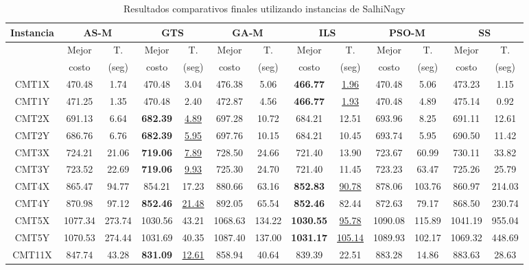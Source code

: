\begin{table}[h]
\caption{ Resultados comparativos finales utilizando instancias de SalhiNagy}
\centering
\scriptsize
\begin{tabular}{|c||c c|c c|c c|c c|c c|c c|}
\hline
\textbf{Instancia} & \multicolumn{2}{c|}{\textbf{AS-M}} & \multicolumn{2}{c|}{\textbf{GTS}} & 
\multicolumn{2}{c|}{\textbf{GA-M}} & \multicolumn{2}{c|}{\textbf{ILS}} & \multicolumn{2}{c|}{\textbf{PSO-M}} & \multicolumn{2}{c|}{\textbf{SS}} \\\hline
 & Mejor & T. & Mejor & T. & Mejor & T. & Mejor & T. & Mejor & T. & Mejor & T.\\
 & costo & (seg) & costo & (seg) & costo & (seg) & costo & (seg) & costo & (seg) & costo & (seg)\\\hline\hline
CMT1X & 470.48 & 1.74 & 470.48 & 3.04 & 476.38 & 5.06 & \textbf{466.77} & \underline{1.96} & 470.48 & 5.06 & 473.23 & 1.15\\
CMT1Y & 471.25 & 1.35 & 470.48 & 2.40 & 472.87 & 4.56 & \textbf{466.77} & \underline{1.93} & 470.48 & 4.89 & 475.14 & 0.92\\
CMT2X & 691.13 & 6.64 & \textbf{682.39} & \underline{4.89} & 697.28 & 10.72 & 684.21 & 12.51 & 693.96 & 8.25 & 691.11 & 12.61\\
CMT2Y & 686.76 & 6.76 & \textbf{682.39} & \underline{5.95} & 697.76 & 10.15 & 684.21 & 10.45 & 693.74 & 5.95 & 690.50 & 11.42\\
CMT3X & 724.21 & 21.06 & \textbf{719.06} & \underline{7.89} & 728.50 & 24.66 & 721.40 & 13.90 & 723.67 & 60.99 & 730.11 & 33.82\\
CMT3Y & 723.52 & 22.69 & \textbf{719.06} & \underline{9.93} & 725.30 & 24.70 & 721.40 & 11.45 & 723.23 & 63.47 & 725.26 & 25.79\\
CMT4X & 865.47 & 94.77 & 854.21 & 17.23 & 880.66 & 63.16 & \textbf{852.83} & \underline{90.78} & 878.06 & 103.76 & 860.97 & 214.03\\
CMT4Y & 870.98 & 97.12 & \textbf{852.46} & \underline{21.48} & 892.05 & 65.54 & \textbf{852.46} & 82.44 & 872.63 & 79.17 & 868.50 & 230.74\\
CMT5X & 1077.34 & 273.74 & 1030.56 & 43.21 & 1068.63 & 134.22 & \textbf{1030.55} & \underline{95.78} & 1090.08 & 115.89 & 1041.19 & 955.04\\
CMT5Y & 1070.53 & 274.44 & 1031.69 & 40.35 & 1087.40 & 137.00 & \textbf{1031.17} & \underline{105.14} & 1089.93 & 102.17 & 1069.32 & 448.69\\
CMT11X & 847.74 & 43.28 & \textbf{831.09} & \underline{12.61} & 858.94 & 40.64 & 839.39 & 22.51 & 883.28 & 14.86 & 883.63 & 28.63\\

\end{tabular}
\end{table}
